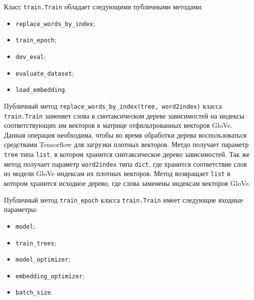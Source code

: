 Класс \texttt{train.Train} обладает следующими публичными методами:
\begin{itemize}
\item \texttt{replace\_words\_by\_index};
\item \texttt{train\_epoch};
\item \texttt{dev\_eval};
\item \texttt{evaluate\_dataset};
\item \texttt{load\_embedding}.
\end{itemize}

Публичный метод \texttt{replace\_words\_by\_index(tree, word2index)} класса \texttt{train.Train} заменяет слова в синтаксическом дереве зависимостей на индексы соответствующих им векторов в матрице отфильтрованных векторов GloVe. Данная операция необходима, чтобы во время обработки дерева воспользоваться средствами Tensorflow для загрузки плотных векторов.  Метдо получает параметр \texttt{tree} типа \texttt{list}, в котором хранится синтаксическое дерево зависимостей. Так же метод получает параметр \texttt{word2index} типа \texttt{dict}, где хранится соответствие слов из модели GloVe индексам их плотных векторов. Метод возвращает \texttt{list} в котором хранится исходное дерево, где слова заменены индексам векторов GloVe.

Публичный метод \texttt{train\_epoch} класса \texttt{train.Train} имеет следующие входные параметры:
\begin{itemize}
\item \texttt{model};
\item \texttt{train\_trees};
\item \texttt{model\_optimizer};
\item \texttt{embedding\_optimizer};
\item \texttt{batch\_size}.
\end{itemize}


